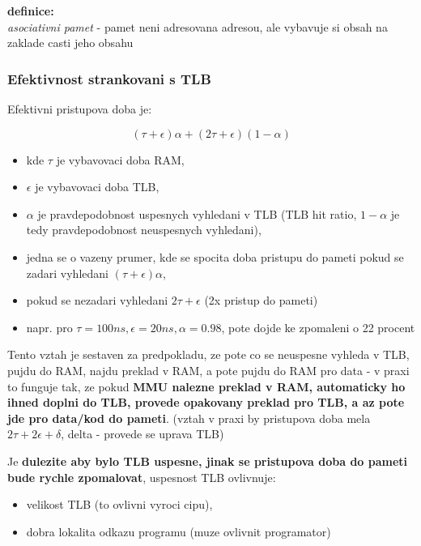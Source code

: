\documentclass[a4paper, 11pt]{article}
\begin{document}
\textbf{definice:} \\[0.5em]
\textit{asociativni pamet} - pamet neni adresovana adresou, ale vybavuje si obsah na zaklade casti jeho obsahu \\

\newpage

\subsubsection{Efektivnost strankovani s TLB}
Efektivni pristupova doba je:

$$(\tau + \epsilon) \alpha + (2 \tau + \epsilon)(1 - \alpha)$$

\begin{itemize}
    \item kde $\tau$ je vybavovaci doba RAM,
    \item $\epsilon$ je vybavovaci doba TLB,
    \item $\alpha$ je pravdepodobnost uspesnych vyhledani v TLB (TLB hit ratio, $1 - \alpha$ je tedy pravdepodobnost neuspesnych vyhledani),
    \item jedna se o vazeny prumer, kde se spocita doba pristupu do pameti pokud se zadari vyhledani $(\tau + \epsilon) \alpha$,
    \item pokud se nezadari vyhledani $2\tau + \epsilon$ (2x pristup do pameti)
    \item napr. pro $\tau = 100ns, \epsilon = 20ns, \alpha = 0.98$, pote dojde ke zpomaleni o 22 procent \\
\end{itemize}

Tento vztah je sestaven za predpokladu, ze pote co se neuspesne vyhleda v TLB, pujdu do RAM, najdu preklad v RAM, a pote pujdu do RAM pro data - v praxi to funguje tak, ze pokud \textbf{MMU nalezne preklad v RAM, automaticky ho ihned doplni do TLB, provede opakovany preklad pro TLB, a az pote jde pro data/kod do pameti}. (vztah v praxi by pristupova doba mela $2\tau + 2\epsilon + \delta$, delta - provede se uprava TLB)

Je \textbf{dulezite aby bylo TLB uspesne, jinak se pristupova doba do pameti bude rychle zpomalovat}, uspesnost TLB ovlivnuje:
\begin{itemize}
    \item velikost TLB (to ovlivni vyroci cipu),
    \item dobra lokalita odkazu programu (muze ovlivnit programator) \\
\end{itemize}
\end{document}
